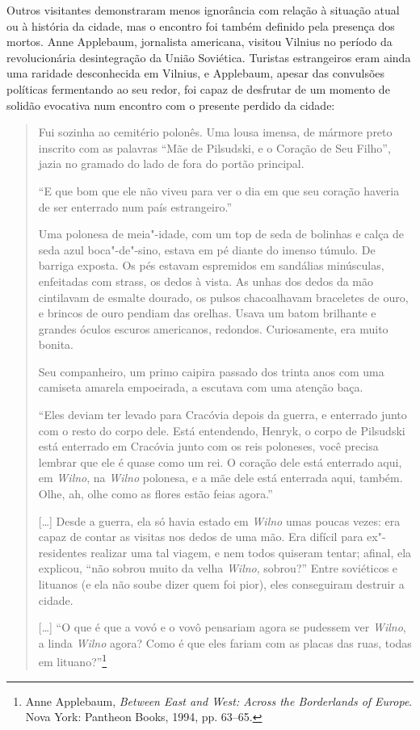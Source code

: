 Outros visitantes demonstraram menos ignorância com relação à situação
atual ou à história da cidade, mas o encontro foi também definido pela
presença dos mortos. Anne Applebaum, jornalista americana, visitou
Vilnius no período da revolucionária desintegração da União Soviética.
Turistas estrangeiros eram ainda uma raridade desconhecida em Vilnius, e
Applebaum, apesar das convulsões políticas fermentando ao seu redor, foi
capaz de desfrutar de um momento de solidão evocativa num encontro com o
presente perdido da cidade:

\begin{quote}
Fui sozinha ao cemitério polonês. Uma lousa imensa, de mármore preto
inscrito com as palavras ``Mãe de Pilsudski, e o Coração de Seu Filho'',
jazia no gramado do lado de fora do portão principal.

``E que bom que ele não viveu para ver o dia em que seu coração haveria
de ser enterrado num país estrangeiro.''

Uma polonesa de meia"-idade, com um top de seda de bolinhas e calça de
seda azul boca"-de"-sino, estava em pé diante do imenso túmulo. De barriga
exposta. Os pés estavam espremidos em sandálias minúsculas, enfeitadas
com strass, os dedos à vista. As unhas dos dedos da mão cintilavam de
esmalte dourado, os pulsos chacoalhavam braceletes de ouro, e brincos de
ouro pendiam das orelhas. Usava um batom brilhante e grandes óculos
escuros americanos, redondos. Curiosamente, era muito bonita.

Seu companheiro, um primo caipira passado dos trinta anos com uma
camiseta amarela empoeirada, a escutava com uma atenção baça.

``Eles deviam ter levado para Cracóvia depois da guerra, e enterrado
junto com o resto do corpo dele. Está entendendo, Henryk, o corpo de
Pilsudski está enterrado em Cracóvia junto com os reis poloneses, você
precisa lembrar que ele é quase como um rei. O coração dele está
enterrado aqui, em \textit{Wilno}, na \textit{Wilno} polonesa, e a mãe dele está enterrada
aqui, também. Olhe, ah, olhe como as flores estão feias agora.''

[\ldots{}] Desde a guerra, ela só havia estado em \textit{Wilno} umas poucas vezes:
era capaz de contar as visitas nos dedos de uma mão. Era difícil para
ex"-residentes realizar uma tal viagem, e nem todos quiseram tentar;
afinal, ela explicou, ``não sobrou muito da velha \textit{Wilno}, sobrou?'' Entre
soviéticos e lituanos (e ela não soube dizer quem foi pior), eles
conseguiram destruir a cidade.

[\ldots{}] ``O que é que a vovó e o vovô pensariam agora se pudessem ver
\textit{Wilno}, a linda \textit{Wilno} agora? Como é que eles fariam com as placas das
ruas, todas em lituano?''\footnote{Anne Applebaum, \textit{Between East and West: Across the Borderlands of Europe}. Nova York: Pantheon Books, 1994, pp. 63--65.}
\end{quote}

